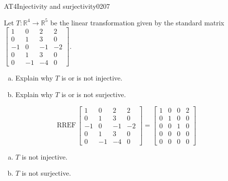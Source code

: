 \newpage




\begin{exercise}{AT4}{Injectivity and surjectivity}{0207} 
\begin{exerciseStatement} 

 Let \(T:\mathbb{R}^4 \to \mathbb{R}^5\) be the linear transformation given by the standard matrix \(\left[\begin{array}{cccc}
1 & 0 & 2 & 2 \\
0 & 1 & 3 & 0 \\
-1 & 0 & -1 & -2 \\
0 & 1 & 3 & 0 \\
0 & -1 & -4 & 0
\end{array}\right]\). 

 

\begin{enumerate}[(a)]
\item 

Explain why \(T\) is or is not injective.


\item 

Explain why \(T\) is or is not surjective.


\end{enumerate}

     \end{exerciseStatement}
 \begin{exerciseAnswer} 

\[\mathrm{RREF}\,\left[\begin{array}{cccc}
1 & 0 & 2 & 2 \\
0 & 1 & 3 & 0 \\
-1 & 0 & -1 & -2 \\
0 & 1 & 3 & 0 \\
0 & -1 & -4 & 0
\end{array}\right]=\left[\begin{array}{cccc}
1 & 0 & 0 & 2 \\
0 & 1 & 0 & 0 \\
0 & 0 & 1 & 0 \\
0 & 0 & 0 & 0 \\
0 & 0 & 0 & 0
\end{array}\right]\]

 

\begin{enumerate}[(a)]
\item  

\(T\) is not injective.

 
\item  

\(T\) is not surjective.

 
\end{enumerate}

     \end{exerciseAnswer}
 \end{exercise}



